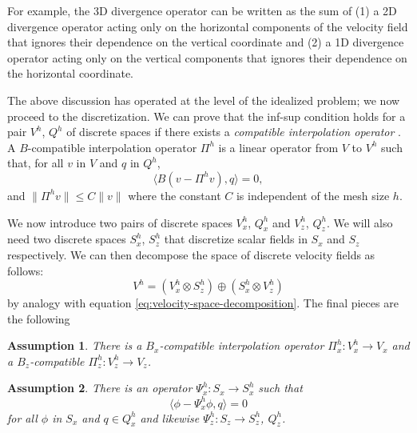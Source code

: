 \documentclass{article}
\theoremstyle{definition}
\theoremstyle{plain}
\newtheorem{asm}{Assumption}
\begin{document}
For example, the 3D divergence operator can be written as the sum of (1) a 2D divergence operator acting only on the horizontal components of the velocity field that ignores their dependence on the vertical coordinate and (2) a 1D divergence operator acting only on the vertical components that ignores their dependence on the horizontal coordinate.

The above discussion has operated at the level of the idealized problem; we now proceed to the discretization.
We can prove that the inf-sup condition holds for a pair $V^h$, $Q^h$ of discrete spaces if there exists a \emph{compatible interpolation operator} \citep{boffi2013mixed}.
A $B$-compatible interpolation operator $\Pi^h$ is a linear operator from $V$ to $V^h$ such that, for all $v$ in $V$ and $q$ in $Q^h$,
\begin{equation}
    \langle B(v - \Pi^hv), q\rangle = 0,
\end{equation}
and $\|\Pi^hv\| \le C\|v\|$ where the constant $C$ is independent of the mesh size $h$.

We now introduce two pairs of discrete spaces $V_x^h$, $Q_x^h$ and $V_z^h$, $Q_z^h$.
We will also need two discrete spaces $S_x^h$, $S_z^h$ that discretize scalar fields in $S_x$ and $S_z$ respectively.
We can then decompose the space of discrete velocity fields as follows:
\begin{equation}
    V^h = \left(V_x^h \otimes S_z^h\right)\oplus\left(S_x^h\otimes V_z^h\right)
\end{equation}
by analogy with equation \eqref{eq:velocity-space-decomposition}.
The final pieces are the following
\begin{asm} There is a $B_x$-compatible interpolation operator $\Pi_x^h : V_x^h \to V_x$ and a $B_z$-compatible $\Pi_z^h : V_z^h \to V_z$.
    \label{asm:b-compatible-operators}
\end{asm}
\begin{asm} There is an operator $\Psi_x^h : S_x \to S_x^h$ such that
    \begin{equation}
        \langle \phi - \Psi_x^h\phi, q\rangle = 0
    \end{equation}
    for all $\phi$ in $S_x$ and $q \in Q_x^h$ and likewise $\Psi_z^h : S_z \to S_z^h$, $Q_z^h$.
    \label{asm:ortho-projection}
\end{asm}
\end{document}
